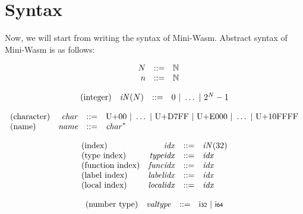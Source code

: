 \documentclass{article}
\begin{document}
\section{Syntax}
Now, we will start from writing the syntax of Mini-Wasm.
Abstract syntax of Mini-Wasm is as follows:

$$
\begin{array}{@{}lrrl@{}l@{}}
	& N &::=& \mathbb{N} \\
	& n &::=& \mathbb{N} \\
\end{array}
$$

\vspace{1ex}

$$
\begin{array}{@{}lrrl@{}l@{}}
	\mbox{(integer)} & {\mathit{iN}}(N) &::=& 0 ~|~ \dots ~|~ {2^{N}} - 1 \\
\end{array}
$$

\vspace{1ex}

$$
\begin{array}{@{}lrrl@{}l@{}}
	\mbox{(character)} & {\mathit{char}} &::=& \mathrm{U{+}00} ~|~ \dots ~|~ \mathrm{U{+}D7FF} ~|~ \mathrm{U{+}E000} ~|~ \dots ~|~ \mathrm{U{+}10FFFF} \\
	\mbox{(name)} & {\mathit{name}} &::=& {{\mathit{char}}^\ast} \\
\end{array}
$$

\vspace{1ex}

$$
\begin{array}{@{}lrrl@{}l@{}}
	\mbox{(index)} & {\mathit{idx}} &::=& {\mathit{iN}}(32) \\
	\mbox{(type index)} & {\mathit{typeidx}} &::=& {\mathit{idx}} \\
	\mbox{(function index)} & {\mathit{funcidx}} &::=& {\mathit{idx}} \\
	\mbox{(label index)} & {\mathit{labelidx}} &::=& {\mathit{idx}} \\
	\mbox{(local index)} & {\mathit{localidx}} &::=& {\mathit{idx}} \\
\end{array}
$$

\vspace{1ex}

$$
\begin{array}{@{}lrrl@{}l@{}}
	\mbox{(number type)} & {\mathit{valtype}} &::=& \mathsf{i{\scriptstyle 32}} ~|~ \mathsf{i{\scriptstyle 64}} \\
\end{array}
$$
\end{document}
